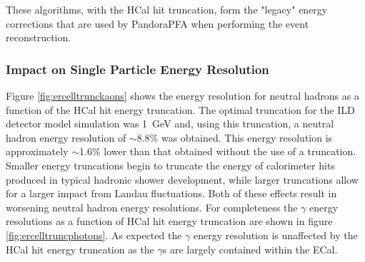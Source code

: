 These algorithms, with the HCal hit truncation, form the "legacy" energy corrections that are used by PandoraPFA when performing the event reconstruction.    


\subsubsection{Impact on Single Particle Energy Resolution}
Figure \ref{fig:ercelltrunckaons} shows the energy resolution for neutral hadrons as a function of the HCal hit energy truncation.  The optimal truncation for the ILD detector model simulation was 1~GeV and, using this truncation, a neutral hadron energy resolution of $\sim$8.8\% was obtained.  This energy resolution is approximately $\sim$1.6\% lower than that obtained without the use of a truncation.  Smaller energy truncations begin to truncate the energy of calorimeter hits produced in typical hadronic shower development, while larger truncations allow for a larger impact from Landau fluctuations.  Both of these effects result in worsening neutral hadron energy resolutions.  For completeness the $\gamma$ energy resolutions as a function of HCal hit energy truncation are shown in figure \ref{fig:ercelltruncphotons}.  As expected the $\gamma$ energy resolution is unaffected by the HCal hit energy truncation as the $\gamma$s are largely contained within the ECal.

